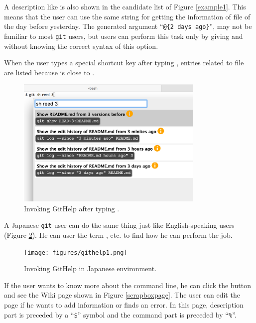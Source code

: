 \documentclass{sigchi}
\def\GH{\textsf{GitHelp}}
\def\GIT{\texttt{git}}
\begin{document}
A description like  is also shown in the candidate list
of Figure \ref{example1}.
This means that the user can use the same string 
for getting the information of  file of the day before yesterday.
The generated argument
``{\smallfont\verb|@{2 days ago}|}'',
may not be familiar to most {\GIT} users,
but users can perform this task only by giving  and 
without knowing the correct syntax of this option.

When the user types a special shortcut key
after typing ,
entries related to  file are listed because
 is close to .

\begin{figure}[h]
  \includegraphics[width=9cm,bb=-100 0 800 550]{figures/example2.png}
  \caption{Invoking {\GH} after typing .}
  \label{example2}
\end{figure}

A Japanese {\GIT} user can do the same thing just like
English-speaking users (Figure \ref{example3}).
He can user the term , etc. to find how he can perform the job.

\begin{figure}[t]
  \texttt{[image: figures/githelp1.png]}
  \caption{Invoking {\GH} in Japanese environment.}
  \label{example3}
\end{figure}

If the user wants to know more about the command line,
he can click the
button and see the Wiki page shown in Figure \ref{scrapboxpage}.
The user can edit the page if he wants to add information or finds an error.
In this page, description part is preceded by a ``\texttt{\$}'' symbol and
the command part is preceded by ``\texttt{\%}''.
\end{document}

